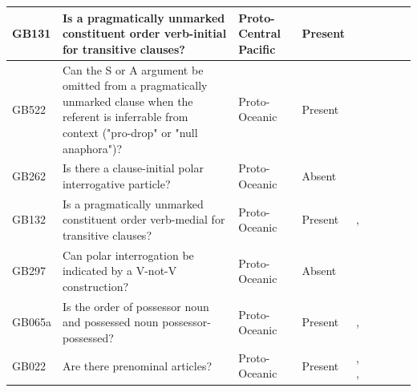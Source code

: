 \documentclass[draft,10pt]{article} %
\begin{document}
\begin{landscape}
\begin{longtable}{| p{2cm}| p{3cm}| p{2.5cm}|p{2cm}|p{2cm}|p{2cm}|p{2cm}|p{2cm}|p{2cm}|}
GB131&Is a pragmatically unmarked constituent order verb-initial for transitive clauses?&Proto-Central Pacific&Present&\citet[122]{kikusawa2002proto}& \cellcolor{hedvig_red!50}{False Negative} & \cellcolor{hedvig_lightgreen!50}{True Positive} & \cellcolor{hedvig_yellow!50}{False Negative} & \cellcolor{hedvig_lightgreen!50}{True Positive} \\ \hline
GB522&Can the S or A argument be omitted from a pragmatically unmarked clause when the referent is inferrable from context ("pro-drop" or "null anaphora")?&Proto-Oceanic&Present&\citet[495]{ross2004morphosyntactic}& \cellcolor{hedvig_lightgreen!50}{True Positive} & \cellcolor{hedvig_yellow!50}{Half} & \cellcolor{hedvig_lightgreen!50}{True Positive} & \cellcolor{hedvig_yellow!50}{Half} \\ \hline
GB262&Is there a clause-initial polar interrogative particle?&Proto-Oceanic&Absent&\citet[89]{lynchrosscrowley_proto_grammar_oceanic}& \cellcolor{hedvig_lightgreen!50}{True Negative} & \cellcolor{hedvig_yellow!50}{Half} & \cellcolor{hedvig_yellow!50}{True Negative} & \cellcolor{hedvig_red!50}{False Positive} \\ \hline
GB132&Is a pragmatically unmarked constituent order verb-medial for transitive clauses?&Proto-Oceanic&Present&\citet[497]{ross2004morphosyntactic}, \citet[117]{pawley1973some}& \cellcolor{hedvig_lightgreen!50}{True Positive} & \cellcolor{hedvig_yellow!50}{Half} & \cellcolor{hedvig_lightgreen!50}{True Positive} & \cellcolor{hedvig_yellow!50}{False Negative} \\ \hline
GB297&Can polar interrogation be indicated by a V-not-V construction?&Proto-Oceanic&Absent&\citet[89]{lynchrosscrowley_proto_grammar_oceanic}& \cellcolor{hedvig_lightgreen!50}{True Negative} & \cellcolor{hedvig_yellow!50}{Half} & \cellcolor{hedvig_yellow!50}{True Negative} & \cellcolor{hedvig_yellow!50}{Half} \\ \hline
GB065a&Is the order of possessor noun and possessed noun possessor-possessed?&Proto-Oceanic&Present&\citet[76]{lynchrosscrowley_proto_grammar_oceanic}, \citet[155-156]{pawley1973some}& \cellcolor{hedvig_lightgreen!50}{True Positive} & \cellcolor{hedvig_yellow!50}{Half} & \cellcolor{hedvig_lightgreen!50}{True Positive} & \cellcolor{hedvig_yellow!50}{Half} \\ \hline
GB022&Are there prenominal articles?&Proto-Oceanic&Present&\citet{crowley1985common}, \citet[70]{lynchrosscrowley_proto_grammar_oceanic}, \citet[112]{pawley1973some}& \cellcolor{hedvig_lightgreen!50}{True Positive} & \cellcolor{hedvig_yellow!50}{Half} & \cellcolor{hedvig_yellow!50}{Half} & \cellcolor{hedvig_yellow!50}{False Negative} \\ \hline

\end{longtable}
\end{landscape}
\end{document}
